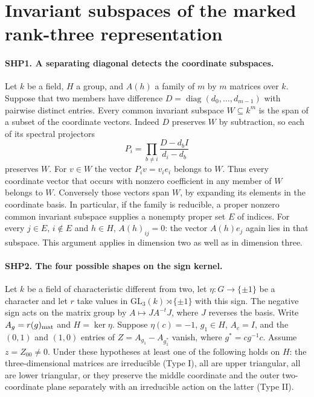 \section{Invariant subspaces of the marked rank-three representation}
\label{sec:marked-shape}

\paragraph{SHP1. A separating diagonal detects the coordinate subspaces.}
\label{claim:SHP1}
Let $k$ be a field, $H$ a group, and $A(h)$ a family of $m$ by $m$
matrices over $k$. Suppose that two members have difference
$D=\operatorname{diag}(d_0,\ldots,d_{m-1})$ with pairwise distinct
entries. Every common invariant subspace $W\subseteq k^m$ is the
span of a subset of the coordinate vectors. Indeed $D$ preserves
$W$ by subtraction, so each of its spectral projectors
\[
                P_i=\prod_{b\ne i}\frac{D-d_b I}{d_i-d_b}
\]
preserves $W$. For $v\in W$ the vector $P_i v=v_i e_i$ belongs to
$W$. Thus every coordinate vector that occurs with nonzero
coefficient in any member of $W$ belongs to $W$. Conversely those
vectors span $W$, by expanding its elements in the coordinate
basis. In particular, if the family is reducible, a proper nonzero
common invariant subspace supplies a nonempty proper set $E$ of
indices. For every $j\in E$, $i\notin E$ and $h\in H$,
$A(h)_{ij}=0$: the vector $A(h)e_j$ again lies in that subspace.
This argument applies in dimension two as well as in dimension three.

\paragraph{SHP2. The four possible shapes on the sign kernel.}
\label{claim:SHP2}
Let $k$ be a field of characteristic different from two, let
$\eta:G\to\{\pm1\}$ be a character and let $r$ take values in
$\mathrm{GL}_3(k)\rtimes\{\pm1\}$ with this sign. The negative
sign acts on the matrix group by $A\mapsto JA^{-t}J$, where $J$
reverses the basis. Write $A_g=r(g)_{\rm mat}$ and $H=\ker\eta$.
Suppose $\eta(c)=-1$, $g_1\in H$, $A_c=I$, and the $(0,1)$ and
$(1,0)$ entries of $Z=A_{g_1}-A_{g_1^*}$ vanish, where
$g^*=cg^{-1}c$. Assume $z=Z_{00}\ne0$. Under these hypotheses
at least one of the following holds on $H$: the three-dimensional
matrices are irreducible (Type I), all are upper triangular, all
are lower triangular, or they preserve the middle coordinate and
the outer two-coordinate plane separately with an irreducible action
on the latter (Type II).

